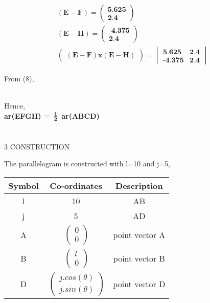 \documentclass[a4paper,12pt]{report}
\newcommand{\myvec}[1]{\ensuremath{\begin{pmatrix}#1\end{pmatrix}}}
\let\vec\mathbf
\newcommand{\mydet}[1]{\ensuremath{\begin{vmatrix}#1\end{vmatrix}}}
\begin{document}
\begin{multicols}{2}
\begin{align}
	\vec{(E-F)} = \myvec{\textbf{5.625}\\\textbf{2.4}}\\
		      \vec{(E-H)} = \myvec{\textbf{-4.375}\\\textbf{2.4}}\\
		      \myvec{\vec{(E-F)x(E-H)}} = \mydet{\textbf{5.625}&\textbf{2.4}\\\textbf{-4.375}&\textbf{2.4}}
\end{align}
\raggedright{From (8),}\\\vspace{5mm}\\
\raggedright\large{Hence,}\vspace{2mm}\\
\centering\textbf{ar(EFGH) = $\frac{\textbf 1}{\textbf 2}$ ar(ABCD)}\vspace{2mm}\\
\vspace{2mm}\\
\vspace{2mm}\\
\centering \large\textsc{3  C}\footnotesize\textsc{ONSTRUCTION}\vspace{5mm}\\
\raggedright\large{The parallelogram is constructed with l=10 and j=5,} 
\begin{center}
    \label{tab:truthtable}
    \setlength{\arrayrulewidth}{0.2mm}
\setlength{\tabcolsep}{5pt}
\renewcommand{\arraystretch}{1.25}
    \begin{tabular}{|c|c|c|}
    \hline %
      \large\textbf{Symbol} & \large\textbf{Co-ordinates} & \large\textbf{Description}\\
      \hline
	\large l & 10 & \large AB \\
	\large j & 5 & \large AD\\
	\large A &  $\ \begin{pmatrix} 0\\0 \end{pmatrix}$  & \large point vector A\\
	\large B &  $\ \begin{pmatrix} l\\0 \end{pmatrix}$ & \large point vector B\\
	\large D &  $\ \begin{pmatrix} j.cos(\theta)\\j.sin(\theta) \end{pmatrix}$ & \large point vector D\\ 

\end{tabular}
\end{center}
\end{multicols}
\end{document}
